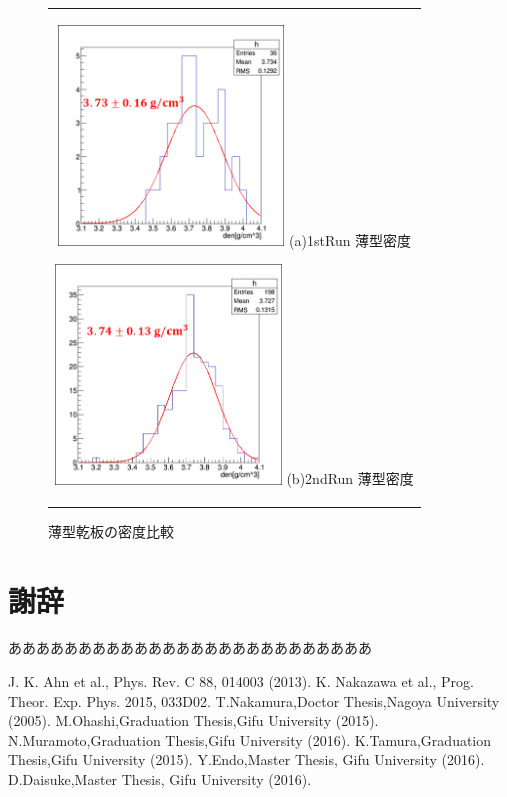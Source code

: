 \documentclass[12pt,a4paper]{jarticle}
\begin{document}
\begin{figure}[htbp]
  \centering
      \begin{tabular}{c}
        \begin{minipage}{0.5\hsize}
          \centering
            \includegraphics[clip, width=60mm]{1stRun_thin_den.png}
            \hspace{1.6cm} (a)1stRun 薄型密度
        \end{minipage}
        
        \begin{minipage}{0.5\hsize}
          \centering
            \includegraphics[clip, width=60mm]{2ndRun_thin_den.png}
            \hspace{1.6cm} (b)2ndRun 薄型密度
        \end{minipage}
    
      \end{tabular}
      \caption{薄型乾板の密度比較\label{fig:compare_thin_den}}
\end{figure}
\newpage
\section*{謝辞}
ああああああああああああああああああああああああああ
\begin{thebibliography}{99}
 J. K. Ahn et al., Phys. Rev. C 88, 014003 (2013).
 K. Nakazawa et al., Prog. Theor. Exp. Phys. 2015, 033D02.
 T.Nakamura,Doctor Thesis,Nagoya University (2005).
 M.Ohashi,Graduation Thesis,Gifu University (2015).
 N.Muramoto,Graduation Thesis,Gifu University (2016).
 K.Tamura,Graduation Thesis,Gifu University (2015).
 Y.Endo,Master Thesis, Gifu University (2016).
 D.Daisuke,Master Thesis, Gifu University (2016).
\end{thebibliography}
\end{document}
